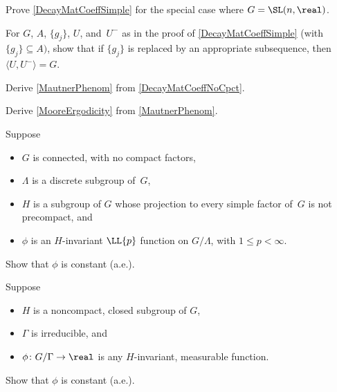 \begin{exercises}
\item \label{DecayMatCoeffSL3}
Prove \cref{DecayMatCoeffSimple} for the special case where $G = \SL(n,\real)$.

\item \label{horosubseq}
For $G$, $A$, $\{g_j\}$, $U$, and~$U^-$ as in the proof of \cref{DecayMatCoeffSimple} (with $\{g_j\} \subseteq A)$, show that if $\{g_j\}$ is replaced by an appropriate subsequence, then $\langle U , U^- \rangle = G$.

\item \label{MautnerPhenomPfEx}
Derive \cref{MautnerPhenom} from \cref{DecayMatCoeffNoCpct}.

\item \label{MautnerPhenom->MooreErgodicityEx}
Derive \cref{MooreErgodicity} from \cref{MautnerPhenom}.

\item \label{MooreErgNonsimple}
Suppose
	\begin{itemize}
	\item $G$ is connected, with no compact factors,
	\item $\Lambda$ is a discrete subgroup of~$G$,
	\item $H$ is a subgroup of $G$ whose projection to every simple factor of~$G$ is not precompact, 
	and
	\item $\phi$ is an $H$-invariant $\LL{p}$ function on $G/\Lambda$, with $1 \le p < \infty$.
	\end{itemize}
Show that $\phi$ is constant (a.e.).

\item \label{MooreErgLatticeEx}
Suppose
	\begin{itemize}
	\item $H$ is a noncompact, closed subgroup of $G$,
	\item $\Gamma$ is irreducible,
	and
	\item $\phi \colon G/\Gamma \to \real$ is any $H$-invariant, measurable function.
	\end{itemize}
Show that $\phi$ is constant (a.e.).

 \end{exercises}




